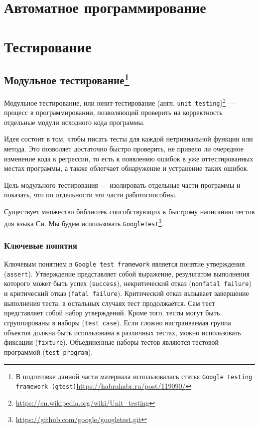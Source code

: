 \documentclass[12pt, twoside]{report}
\begin{document}
\newpage
\chapter*{Автоматное программирование}


\newpage
\chapter*{Тестирование}

\section*{Модульное тестирование\footnote{В подготовке данной части материала использовалась статья \texttt{Google testing framework (gtest)}\url{https://habrahabr.ru/post/119090/}}}

Модульное тестирование, или юнит-тестирование (англ. \texttt{unit testing})\footnote{\url{ https://en.wikipedia.org/wiki/Unit_testing}} — процесс в программировании, 
позволяющий проверить на корректность отдельные модули исходного кода программы.

Идея состоит в том, чтобы писать тесты для каждой нетривиальной функции или метода. Это позволяет достаточно быстро проверить, 
не привело ли очередное изменение кода к регрессии, то есть к появлению ошибок в уже оттестированных местах программы, а также облегчает обнаружение и 
устранение таких ошибок.

Цель модульного тестирования — изолировать отдельные части программы и показать, что по отдельности эти части работоспособны.


Существует множество библиотек способствующих к быстрому написанию тестов для языка Си. Мы будем использовать \texttt{GoogleTest}\footnote{\url{ https://github.com/google/googletest.git}}.


\subsection*{Ключевые понятия}

Ключевым понятием в \texttt{Google test framework} является понятие утверждения (\texttt{assert}). Утверждение представляет собой выражение, результатом выполнения 
которого может быть успех (\texttt{success}), некритический отказ (\texttt{nonfatal failure}) и критический отказ (\texttt{fatal failure}). Критический отказ вызывает 
завершение выполнения теста, в остальных случаях тест продолжается. Сам тест представляет собой набор утверждений. Кроме того, тесты могут быть сгруппированы в 
наборы (\texttt{test case}). Если сложно настраиваемая группа объектов должна быть использована в различных тестах, можно использовать фиксации 
(\texttt{fixture}). Объединенные наборы тестов являются тестовой программой (\texttt{test program}).
\end{document}
